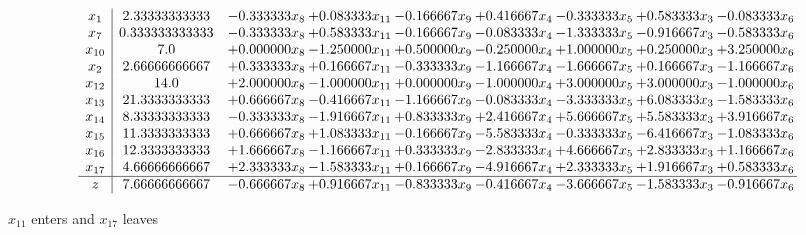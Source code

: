 \documentclass[10pt]{article}
\begin{document}
 \[\begin{array}{c| c c@{\hskip 2pt} c@{\hskip 2pt} c@{\hskip 2pt} c@{\hskip 2pt} c@{\hskip 2pt} c@{\hskip 2pt} c@{\hskip 2pt} }
 x_{1}   &  2.33333333333 & -0.333333 x_{8} & + 0.083333 x_{11} & -0.166667 x_{9} & + 0.416667 x_{4} & -0.333333 x_{5} & + 0.583333 x_{3} & -0.083333 x_{6}\\
 x_{7}   &  0.333333333333 & -0.333333 x_{8} & + 0.583333 x_{11} & -0.166667 x_{9} & -0.083333 x_{4} & -1.333333 x_{5} & -0.916667 x_{3} & -0.583333 x_{6}\\
 x_{10}   &  7.0 & + 0.000000 x_{8} & -1.250000 x_{11} & + 0.500000 x_{9} & -0.250000 x_{4} & + 1.000000 x_{5} & + 0.250000 x_{3} & + 3.250000 x_{6}\\
 x_{2}   &  2.66666666667 & + 0.333333 x_{8} & + 0.166667 x_{11} & -0.333333 x_{9} & -1.166667 x_{4} & -1.666667 x_{5} & + 0.166667 x_{3} & -1.166667 x_{6}\\
 x_{12}   &  14.0 & + 2.000000 x_{8} & -1.000000 x_{11} & + 0.000000 x_{9} & -1.000000 x_{4} & + 3.000000 x_{5} & + 3.000000 x_{3} & -1.000000 x_{6}\\
 x_{13}   &  21.3333333333 & + 0.666667 x_{8} & -0.416667 x_{11} & -1.166667 x_{9} & -0.083333 x_{4} & -3.333333 x_{5} & + 6.083333 x_{3} & -1.583333 x_{6}\\
 x_{14}   &  8.33333333333 & -0.333333 x_{8} & -1.916667 x_{11} & + 0.833333 x_{9} & + 2.416667 x_{4} & + 5.666667 x_{5} & + 5.583333 x_{3} & + 3.916667 x_{6}\\
 x_{15}   &  11.3333333333 & + 0.666667 x_{8} & + 1.083333 x_{11} & -0.166667 x_{9} & -5.583333 x_{4} & -0.333333 x_{5} & -6.416667 x_{3} & -1.083333 x_{6}\\
 x_{16}   &  12.3333333333 & + 1.666667 x_{8} & -1.166667 x_{11} & + 0.333333 x_{9} & -2.833333 x_{4} & + 4.666667 x_{5} & + 2.833333 x_{3} & + 1.166667 x_{6}\\
 x_{17}   &  4.66666666667 & + 2.333333 x_{8} & -1.583333 x_{11} & + 0.166667 x_{9} & -4.916667 x_{4} & + 2.333333 x_{5} & + 1.916667 x_{3} & + 0.583333 x_{6}\\
\hline
z    &  7.66666666667 & -0.666667 x_{8} & + 0.916667 x_{11} & -0.833333 x_{9} & -0.416667 x_{4} & -3.666667 x_{5} & -1.583333 x_{3} & -0.916667 x_{6}\\
\end{array}\]


 $ x_{11} $ enters and $ x_{17} $ leaves 
\end{document}
